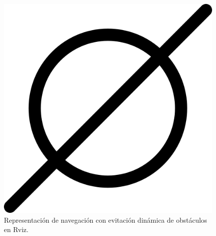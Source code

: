 \begin{figure}[htbp]
\begin{minipage}[b]{0.45\textwidth}
    \includegraphics[width=\textwidth]{images/poner_foto.png}
    \caption{Representación de navegación con evitación dinámica de obstáculos en Rviz.}
    \label{fig:navegacion_dinamica_rviz}
  \end{minipage}
\end{figure}

